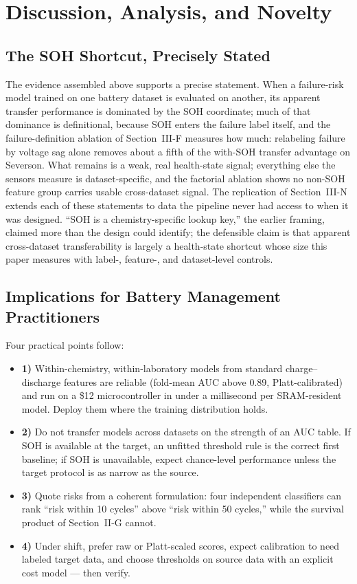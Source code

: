 \documentclass[preprint,12pt]{elsarticle}
\begin{document}
\section{Discussion, Analysis, and Novelty}

\subsection{The SOH Shortcut, Precisely Stated}
The evidence assembled above supports a precise statement. When a failure-risk model trained on one battery dataset is evaluated on another, its apparent transfer performance is dominated by the SOH coordinate; much of that dominance is definitional, because SOH enters the failure label itself, and the failure-definition ablation of Section~III-F measures how much: relabeling failure by voltage sag alone removes about a fifth of the with-SOH transfer advantage on Severson. What remains is a weak, real health-state signal; everything else the sensors measure is dataset-specific, and the factorial ablation shows no non-SOH feature group carries usable cross-dataset signal. The replication of Section~III-N extends each of these statements to data the pipeline never had access to when it was designed. ``SOH is a chemistry-specific lookup key,'' the earlier framing, claimed more than the design could identify; the defensible claim is that apparent cross-dataset transferability is largely a health-state shortcut whose size this paper measures with label-, feature-, and dataset-level controls.

\subsection{Implications for Battery Management Practitioners}
Four practical points follow:
\begin{itemize}
\item \textbf{1)} Within-chemistry, within-laboratory models from standard charge--discharge features are reliable (fold-mean AUC above 0.89, Platt-calibrated) and run on a \$12 microcontroller in under a millisecond per SRAM-resident model. Deploy them where the training distribution holds.
\item \textbf{2)} Do not transfer models across datasets on the strength of an AUC table. If SOH is available at the target, an unfitted threshold rule is the correct first baseline; if SOH is unavailable, expect chance-level performance unless the target protocol is as narrow as the source.
\item \textbf{3)} Quote risks from a coherent formulation: four independent classifiers can rank ``risk within 10 cycles'' above ``risk within 50 cycles,'' while the survival product of Section~II-G cannot.
\item \textbf{4)} Under shift, prefer raw or Platt-scaled scores, expect calibration to need labeled target data, and choose thresholds on source data with an explicit cost model --- then verify.
\end{itemize}
\end{document}
